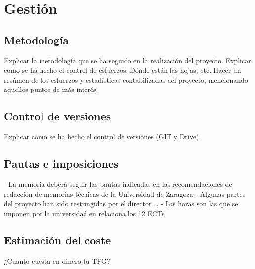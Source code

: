 \chapter{Gestión}
\section{Metodología}
Explicar la metodología que se ha seguido en la realización del proyecto. Explicar como se ha hecho el control de esfuerzos. Dónde están las hojas, etc. Hacer un resúmen de los esfuerzos y estadísticas contabilizadas del proyecto, mencionando aquellos puntos de más interés. 

\section{Control de versiones}
Explicar como se ha hecho el control de versiones (GIT y Drive) 
\section{Pautas e imposiciones}
- La memoria deberá seguir las pautas indicadas en las recomendaciones de redacción de memorias técnicas de la Universidad de Zaragoza
- Algunas partes del proyecto han sido restringidas por el director … 
- Las horas son las que se imponen por la universidad en relaciona los 12 ECTs

\section{Estimación del coste}
¿Cuanto cuesta en dinero tu TFG?

